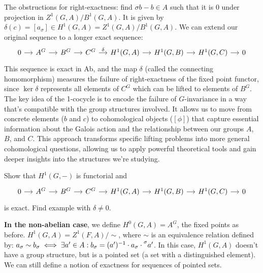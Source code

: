 \begin{outline}
    \1[] The obstructions for right-exactness: find $\sigma b -b \in A$ such that it is $0$ under projection in $Z^1(G,A)/B^1(G,A)$. It is given by $\delta(c) = [a_\sigma]\in H^1(G,A) = Z^1(G,A)/B^1(G,A)$. We can extend our original sequence to a longer exact sequence:
    $$\begin{tikzcd}[column sep=small]
    0 \arrow[r] & A^G \arrow[r] & B^G \arrow[r] & C^G \arrow[r, "\delta"] & H^1(G,A) \arrow[r] & H^1(G,B) \arrow[r] & H^1(G,C) \arrow[r] & 0
    \end{tikzcd}$$
    This sequence is exact in Ab, and the map $\delta$ (called the connecting homomorphism) measures the failure of right-exactness of the fixed point functor, since $\ker \delta$ represents all elements of $C^G$ which can be lifted to elements of $B^G$.
    \1 The key idea of the 1-cocycle is to encode the failure of $G$-invariance in a way that's compatible with the group structures involved. It allows us to move from concrete elements ($b$ and $c$) to cohomological objects ($[\phi]$) that capture essential information about the Galois action and the relationship between our groups $A$, $B$, and $C$.
    This approach transforms specific lifting problems into more general cohomological questions, allowing us to apply powerful theoretical tools and gain deeper insights into the structures we're studying.

\begin{exercise}
    Show that $H^1(G,-)$ is functorial and 
    $$\begin{tikzcd}[column sep=small]
    0 \arrow[r] & A^G \arrow[r] & B^G \arrow[r] & C^G \arrow[r] & H^1(G,A) \arrow[r] & H^1(G,B) \arrow[r] & H^1(G,C) \arrow[r] & 0
    \end{tikzcd}$$
    is exact. Find example with $\delta \neq 0$.
\end{exercise}

    \1 \textbf{In the non-abelian case}, we define 
        \2 $H^0(G,A)=A^G$, the fixed points as before. 
        \2 $H^1(G,A)=Z^1(F,A)/\sim$, where $\sim$ is an equivalence relation defined by: $a_\sigma \sim b_\sigma \iff \exists a' \in A : b_\sigma = (a')^{-1} \cdot a_\sigma \cdot \prescript{\sigma}{}{a'}$. 
    \1[] In this case, $H^1(G,A)$ doesn't have a group structure, but is a pointed set (a set with a distinguished element). We can still define a notion of exactness for sequences of pointed sets.


\end{outline}
